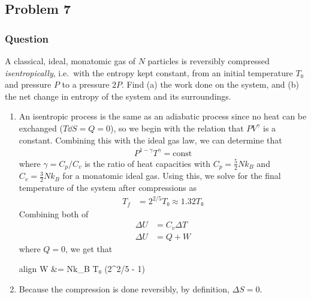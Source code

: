 \clearpage
\subsection{Problem 7}
\subsubsection{Question}
	
A classical, ideal, monatomic gas of $N$ particles is reversibly compressed 
\emph{isentropically}, i.e.~with the entropy kept constant, from an initial 
temperature $T₀$ and pressure $P$ to a pressure $2P$. Find (a) the work done 
on the system, and (b) the net change in entropy of the system and its 
surroundings.

\begin{enumerate}
	\item
		An isentropic process is the same as an adiabatic process since no
		heat can be exchanged ($T\dd S = Q = 0$), so we begin with the relation
		that $PV^{γ}$ is a constant. Combining this with the ideal gas law, 
		we can determine that
		\begin{align*}
			P^{1-γ}T^{γ} = \mathrm{const}
		\end{align*}
		where $γ = C_p/C_v$ is the ratio of heat capacities with $C_p =
		\frac 52 Nk_B$ and $C_v = \frac 32 Nk_B$ for a monatomic ideal gas. 
		Using this, we solve for the final temperature of the system after 
		compressions as
		\begin{align*}
			T_f &= 2^{2/5} T₀ ≈ 1.32T₀
		\end{align*}
		Combining both of
		\begin{align*}
			ΔU &= C_v ΔT \\
			ΔU &= Q + W
		\end{align*}
		where $Q = 0$, we get that
		\begin{empheq}[box=\fbox]{align}
			W &=  Nk_B T₀ (2^{2/5} - 1)
		\end{empheq}
	\item
		Because the compression is done reversibly, by definition, $ΔS = 0$.
\end{enumerate}

\clearpage
